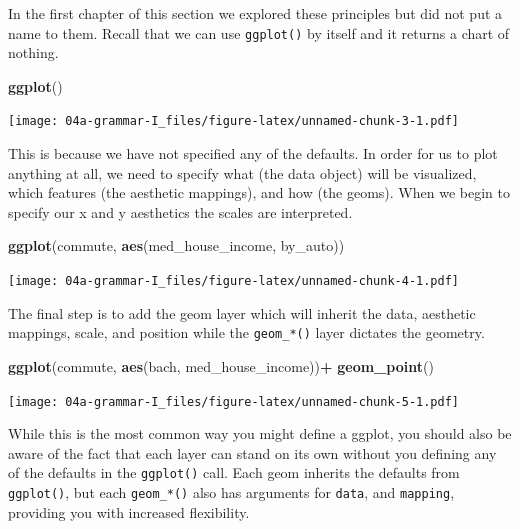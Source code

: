 \documentclass[
]{book}
\newenvironment{Shaded}{\begin{snugshade}}{\end{snugshade}}
\newcommand{\KeywordTok}[1]{\textcolor[rgb]{0.13,0.29,0.53}{\textbf{#1}}}
\newcommand{\NormalTok}[1]{#1}
\newcommand{\OperatorTok}[1]{\textcolor[rgb]{0.81,0.36,0.00}{\textbf{#1}}}
\newcommand{\StringTok}[1]{\textcolor[rgb]{0.31,0.60,0.02}{#1}}
\begin{document}
In the first chapter of this section we explored these principles but did not put a name to them. Recall that we can use \texttt{ggplot()} by itself and it returns a chart of nothing.

\begin{Shaded}
\begin{Highlighting}[]
\KeywordTok{ggplot}\NormalTok{()}
\end{Highlighting}
\end{Shaded}

\texttt{[image: 04a-grammar-I\_files/figure-latex/unnamed-chunk-3-1.pdf]}

This is because we have not specified any of the defaults. In order for us to plot anything at all, we need to specify what (the data object) will be visualized, which features (the aesthetic mappings), and how (the geoms). When we begin to specify our x and y aesthetics the scales are interpreted.

\begin{Shaded}
\begin{Highlighting}[]
\KeywordTok{ggplot}\NormalTok{(commute, }\KeywordTok{aes}\NormalTok{(med\_house\_income, by\_auto))}
\end{Highlighting}
\end{Shaded}

\texttt{[image: 04a-grammar-I\_files/figure-latex/unnamed-chunk-4-1.pdf]}

The final step is to add the geom layer which will inherit the data, aesthetic mappings, scale, and position while the \texttt{geom\_*()} layer dictates the geometry.

\begin{Shaded}
\begin{Highlighting}[]
\KeywordTok{ggplot}\NormalTok{(commute, }\KeywordTok{aes}\NormalTok{(bach, med\_house\_income))}\OperatorTok{+}\StringTok{ }
\StringTok{  }\KeywordTok{geom\_point}\NormalTok{()}
\end{Highlighting}
\end{Shaded}

\texttt{[image: 04a-grammar-I\_files/figure-latex/unnamed-chunk-5-1.pdf]}

While this is the most common way you might define a ggplot, you should also be aware of the fact that each layer can stand on its own without you defining any of the defaults in the \texttt{ggplot()} call. Each geom inherits the defaults from \texttt{ggplot()}, but each \texttt{geom\_*()} also has arguments for \texttt{data}, and \texttt{mapping}, providing you with increased flexibility.
\end{document}
